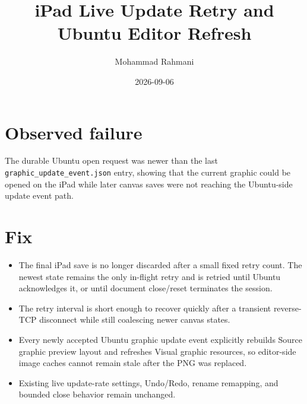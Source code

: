 \documentclass[a4paper]{article}
\title{iPad Live Update Retry and Ubuntu Editor Refresh}
\date{2026-09-06}
\author{Mohammad Rahmani}
\begin{document}
   \maketitle

   \section{Observed failure}
   The durable Ubuntu open request was newer than the last
   \texttt{graphic\_update\_event.json} entry, showing that the current graphic
   could be opened on the iPad while later canvas saves were not reaching the
   Ubuntu-side update event path.

   \section{Fix}
   \begin{itemize}
      \item The final iPad save is no longer discarded after a small fixed retry
      count. The newest state remains the only in-flight retry and is retried
      until Ubuntu acknowledges it, or until document close/reset terminates
      the session.
      \item The retry interval is short enough to recover quickly after a
      transient reverse-TCP disconnect while still coalescing newer canvas
      states.
      \item Every newly accepted Ubuntu graphic update event explicitly rebuilds
      Source graphic preview layout and refreshes Visual graphic resources, so
      editor-side image caches cannot remain stale after the PNG was replaced.
      \item Existing live update-rate settings, Undo/Redo, rename remapping,
      and bounded close behavior remain unchanged.
   \end{itemize}

   
   
\end{document}
